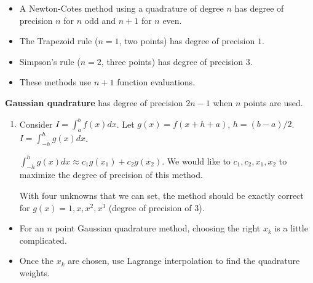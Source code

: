 \documentclass[12pt,letterpaper,noanswers]{exam}
\begin{document}
\begin{tcolorbox}

\begin{itemize}
\itemsep0pt
    \item A Newton-Cotes method using a quadrature of degree $n$ has degree of precision $n$ for $n$ odd and $n+1$ for $n$ even.
    \item The Trapezoid rule ($n = 1$, two points) has degree of precision $1$.
    \item Simpson's rule ($n=2$, three points) has degree of precision $3$.
    \item These methods use $n+1$ function evaluations.
\end{itemize}
\textbf{Gaussian quadrature} has degree of precision $2n-1$ when $n$ points are used.
\end{tcolorbox}
\begin{enumerate}[resume=classQ]
    \item Consider $I = \int_a^b f(x)dx$.  Let $g(x) = f(x+h+a)$, $h = (b-a)/2$.  $I = \int_{-h}^h g(x) dx$.
    
        $\int_{-h}^h g(x) dx \approx c_1 g(x_1) + c_2 g(x_2)$.  We would like to $c_1, c_2, x_1, x_2$ to maximize the degree of precision of this method.  
        
        With four unknowns that we can set, the method should be exactly correct for $g(x) = 1, x, x^2, x^3$ (degree of precision of $3$).
\end{enumerate}
\eject

\begin{tcolorbox}
\begin{itemize}
\itemsep0pt
    \item For an $n$ point Gaussian quadrature method, choosing the right $x_k$ is a little complicated.
    \item Once the $x_k$ are chosen, use Lagrange interpolation to find the quadrature weights.  %
\end{itemize}

\end{tcolorbox}
\end{document}
